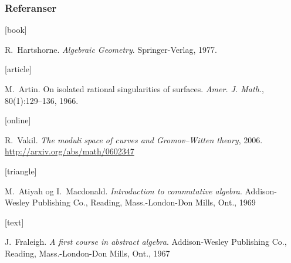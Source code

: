 \documentclass[norsk]{beamer}
\begin{document}
\begin{frame}[allowframebreaks]
    \frametitle{Referanser}

    \begin{thebibliography}{}

        [book]

        R.~Hartshorne.
        \newblock \emph{Algebraic Geometry}.
        \newblock Springer-Verlag, 1977.

        [article]

        M.~Artin.
        \newblock On isolated rational singularities of surfaces.
        \newblock \emph{Amer. J. Math.}, 80(1):129--136, 1966.

       [online]

       R.~Vakil.
       \newblock \emph{The moduli space of curves and Gromov--Witten theory}, 2006.
       \newblock \url{http://arxiv.org/abs/math/0602347}

       [triangle]

       M.~Atiyah og I.~Macdonald.
       \newblock \emph{Introduction to commutative algebra}.
       \newblock Addison-Wesley Publishing Co., Reading, Mass.-London-Don
       Mills, Ont., 1969

       [text]

       J.~Fraleigh.
       \newblock \emph{A first course in abstract algebra}.
       \newblock Addison-Wesley Publishing Co., Reading, Mass.-London-Don Mills, Ont., 1967

       \end{thebibliography}
\end{frame}
\end{document}
